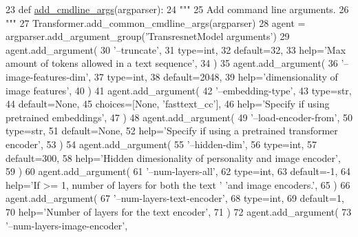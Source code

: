 \begin{DoxyCode}
23     \textcolor{keyword}{def }\hyperlink{namespaceparlai_1_1agents_1_1drqa_1_1config_a62fdd5554f1da6be0cba185271058320}{add\_cmdline\_args}(argparser):
24         \textcolor{stringliteral}{"""}
25 \textcolor{stringliteral}{        Add command line arguments.}
26 \textcolor{stringliteral}{        """}
27         Transformer.add\_common\_cmdline\_args(argparser)
28         agent = argparser.add\_argument\_group(\textcolor{stringliteral}{'TransresnetModel arguments'})
29         agent.add\_argument(
30             \textcolor{stringliteral}{'--truncate'},
31             type=int,
32             default=32,
33             help=\textcolor{stringliteral}{'Max amount of tokens allowed in a text sequence'},
34         )
35         agent.add\_argument(
36             \textcolor{stringliteral}{'--image-features-dim'},
37             type=int,
38             default=2048,
39             help=\textcolor{stringliteral}{'dimensionality of image features'},
40         )
41         agent.add\_argument(
42             \textcolor{stringliteral}{'--embedding-type'},
43             type=str,
44             default=\textcolor{keywordtype}{None},
45             choices=[\textcolor{keywordtype}{None}, \textcolor{stringliteral}{'fasttext\_cc'}],
46             help=\textcolor{stringliteral}{'Specify if using pretrained embeddings'},
47         )
48         agent.add\_argument(
49             \textcolor{stringliteral}{'--load-encoder-from'},
50             type=str,
51             default=\textcolor{keywordtype}{None},
52             help=\textcolor{stringliteral}{'Specify if using a pretrained transformer encoder'},
53         )
54         agent.add\_argument(
55             \textcolor{stringliteral}{'--hidden-dim'},
56             type=int,
57             default=300,
58             help=\textcolor{stringliteral}{'Hidden dimesionality of personality and image encoder'},
59         )
60         agent.add\_argument(
61             \textcolor{stringliteral}{'--num-layers-all'},
62             type=int,
63             default=-1,
64             help=\textcolor{stringliteral}{'If >= 1, number of layers for both the text '} \textcolor{stringliteral}{'and image encoders.'},
65         )
66         agent.add\_argument(
67             \textcolor{stringliteral}{'--num-layers-text-encoder'},
68             type=int,
69             default=1,
70             help=\textcolor{stringliteral}{'Number of layers for the text encoder'},
71         )
72         agent.add\_argument(
73             \textcolor{stringliteral}{'--num-layers-image-encoder'},

\end{DoxyCode}
